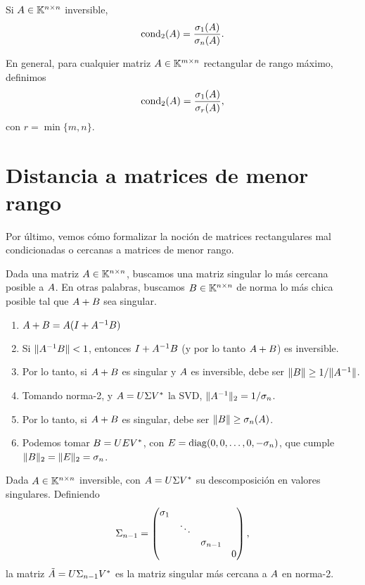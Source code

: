 \begin{corolario}
Si $\Ab \in \K^{n \times n}$ inversible,
$$
\cond_2(\Ab) = \frac{\sigma_1(\Ab)}{\sigma_n(\Ab)}.
$$
\end{corolario}

En general, para cualquier matriz $\Ab \in \K^{m \times n}$ rectangular de rango máximo, definimos $$\cond_2(\Ab) = \frac{\sigma_1(\Ab)}{\sigma_r(\Ab)},$$
con $r = \min\{m,n\}$.

\section{Distancia a matrices de menor rango}

Por último, vemos cómo formalizar la noción de matrices rectangulares mal condicionadas o cercanas a matrices de menor rango.

Dada una matriz $\Ab \in \K^{n \times n}$, buscamos una matriz singular lo más cercana posible a $\Ab$.
En otras palabras, buscamos $\Bb \in \K^{n \times n}$ de norma lo más chica posible tal que $\Ab + \Bb$ sea singular.

\begin{enumerate}
\item $\Ab + \Bb = \Ab (\Ib + \Ab^{-1} \Bb)$
\item Si $\|\Ab^{-1}\Bb\| < 1$, entonces $\Ib + \Ab^{-1}\Bb$ (y por lo tanto $\Ab+\Bb$) es inversible.
\item Por lo tanto, si $\Ab + \Bb$ es singular y $\Ab$ es inversible, debe ser $\|\Bb\| \ge 1 / \|\Ab^{-1}\|$.
\item Tomando norma-2, y $\Ab = \Ub \Sigmab \Vb^*$ la SVD, $\|\Ab^{-1}\|_2 = 1/\sigma_n$.
\item Por lo tanto, si $\Ab+\Bb$ es singular, debe ser $\|\Bb\| \ge \sigma_n(\Ab)$.
\item Podemos tomar $\Bb = \Ub \Eb \Vb^*$, con $\Eb = \diag(0, 0, \dots, 0, -\sigma_n)$, que cumple $\|\Bb\|_2 = \|\Eb\|_2 = \sigma_n$.
\end{enumerate}

\begin{teo}
Dada $\Ab \in \K^{n \times n}$ inversible, con $\Ab = \Ub \Sigmab \Vb^*$ su descomposición en valores singulares.
Definiendo
{\small
$$\Sigmab_{n-1} =
\begin{pmatrix}
\sigma_1 & & & \\
 & \ddots & & \\
 & & \sigma_{n-1} & \\
 & &  & 0
\end{pmatrix},
$$
}
la matriz $\tilde \Ab = \Ub \Sigmab_{n-1} \Vb^*$ es la matriz singular m\'as cercana a $\Ab$ en norma-2.
\end{teo}

